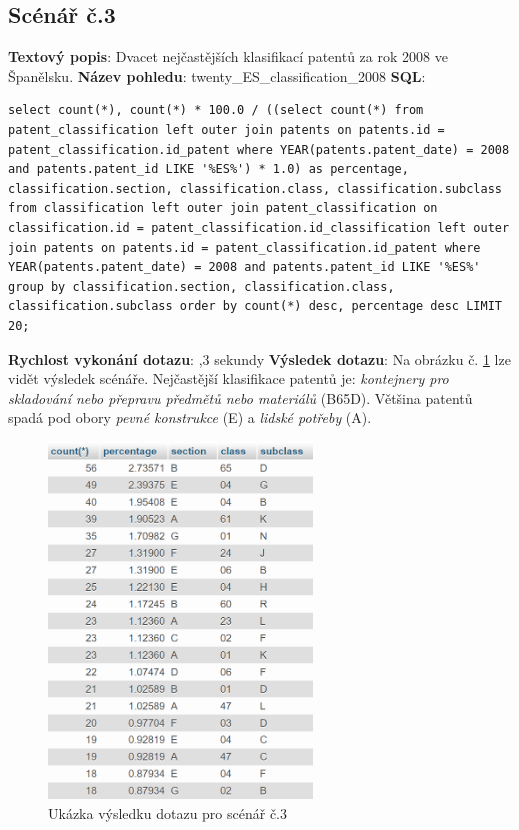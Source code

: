 \subsection{Scénář č.3}
\textbf{Textový popis}: Dvacet nejčastějších klasifikací patentů za rok 2008 ve Španělsku.
\newline
\textbf{Název pohledu}: twenty\_ES\_classification\_2008
\newline
\textbf{SQL}:
\begin{lstlisting}[label = {lst:elements_a}]
select count(*), count(*) * 100.0 / ((select count(*) from patent_classification left outer join patents on patents.id = patent_classification.id_patent where YEAR(patents.patent_date) = 2008 and patents.patent_id LIKE '%ES%') * 1.0) as percentage, classification.section, classification.class, classification.subclass from classification left outer join patent_classification on classification.id = patent_classification.id_classification left outer join patents on patents.id = patent_classification.id_patent where YEAR(patents.patent_date) = 2008 and patents.patent_id LIKE '%ES%' group by classification.section, classification.class, classification.subclass order by count(*) desc, percentage desc LIMIT 20;
\end{lstlisting}
\textbf{Rychlost vykonání dotazu}: ,3 sekundy
\newline
\textbf{Výsledek dotazu}: Na obrázku č. \ref{fig:scenar3} lze vidět výsledek scénáře. Nejčastější klasifikace patentů je: \textit{kontejnery pro skladování nebo přepravu předmětů nebo materiálů} (B65D). Většina patentů spadá pod obory \textit{pevné konstrukce} (E) a \textit{lidské potřeby} (A).
\begin{figure}[H]
\centering
\includegraphics[width=7cm]{img/scenare/scenar_3}
\caption{Ukázka výsledku dotazu pro scénář č.3}
\label{fig:scenar3}
\end{figure}

